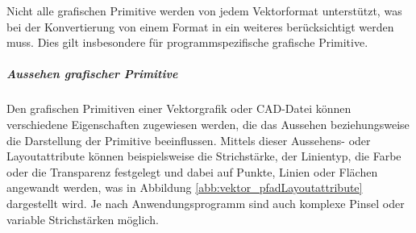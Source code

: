 Nicht alle grafischen Primitive werden von jedem Vektorformat unterstützt, was bei der Konvertierung von einem Format in ein weiteres berücksichtigt werden muss. Dies gilt insbesondere für programmspezifische grafische Primitive.

\subparagraph{Aussehen grafischer Primitive}
Den grafischen Primitiven einer Vektorgrafik oder CAD-Datei können verschiedene Eigenschaften zugewiesen werden, die das Aussehen beziehungsweise die Darstellung der Primitive beeinflussen. Mittels dieser Aussehens- oder Layoutattribute können beispielsweise die Strichstärke, der Linientyp, die Farbe oder die Transparenz festgelegt und dabei auf Punkte, Linien oder Flächen angewandt werden, was in Abbildung \ref{abb:vektor_pfadLayoutattribute} dargestellt wird. Je nach Anwendungsprogramm sind auch komplexe Pinsel oder variable Strichstärken möglich. 

